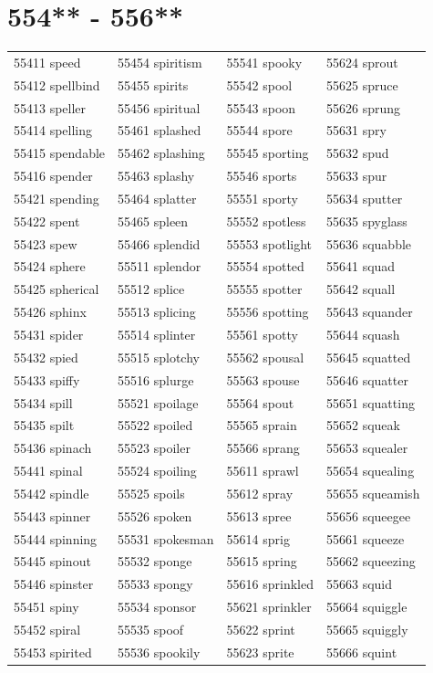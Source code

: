 \documentclass[10pt, oneside]{book}
\begin{document}
\begin{table}
	\centering
	\section*{554** - 556**}
	\begin{tabular}{l l l l}
55411 speed &55454 spiritism &55541 spooky &55624 sprout\\
55412 spellbind &55455 spirits &55542 spool &55625 spruce\\
55413 speller &55456 spiritual &55543 spoon &55626 sprung\\
55414 spelling &55461 splashed &55544 spore &55631 spry\\
55415 spendable &55462 splashing &55545 sporting &55632 spud\\
55416 spender &55463 splashy &55546 sports &55633 spur\\
55421 spending &55464 splatter &55551 sporty &55634 sputter\\
55422 spent &55465 spleen &55552 spotless &55635 spyglass\\
55423 spew &55466 splendid &55553 spotlight &55636 squabble\\
55424 sphere &55511 splendor &55554 spotted &55641 squad\\
55425 spherical &55512 splice &55555 spotter &55642 squall\\
55426 sphinx &55513 splicing &55556 spotting &55643 squander\\
55431 spider &55514 splinter &55561 spotty &55644 squash\\
55432 spied &55515 splotchy &55562 spousal &55645 squatted\\
55433 spiffy &55516 splurge &55563 spouse &55646 squatter\\
55434 spill &55521 spoilage &55564 spout &55651 squatting\\
55435 spilt &55522 spoiled &55565 sprain &55652 squeak\\
55436 spinach &55523 spoiler &55566 sprang &55653 squealer\\
55441 spinal &55524 spoiling &55611 sprawl &55654 squealing\\
55442 spindle &55525 spoils &55612 spray &55655 squeamish\\
55443 spinner &55526 spoken &55613 spree &55656 squeegee\\
55444 spinning &55531 spokesman &55614 sprig &55661 squeeze\\
55445 spinout &55532 sponge &55615 spring &55662 squeezing\\
55446 spinster &55533 spongy &55616 sprinkled &55663 squid\\
55451 spiny &55534 sponsor &55621 sprinkler &55664 squiggle\\
55452 spiral &55535 spoof &55622 sprint &55665 squiggly\\
55453 spirited &55536 spookily &55623 sprite &55666 squint\\
	\end{tabular}
 \end{table}
\clearpage
\end{document}
